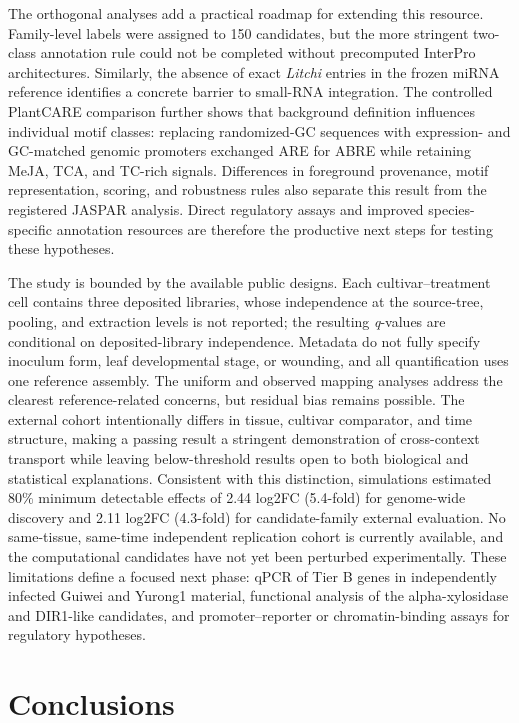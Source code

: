 \documentclass[11pt]{article}
\newcommand{\q}{\textit{q}}
\begin{document}
The orthogonal analyses add a practical roadmap for extending this resource. Family-level labels were assigned to 150 candidates, but the more stringent two-class annotation rule could not be completed without precomputed InterPro architectures. Similarly, the absence of exact \textit{Litchi} entries in the frozen miRNA reference identifies a concrete barrier to small-RNA integration. The controlled PlantCARE comparison further shows that background definition influences individual motif classes: replacing randomized-GC sequences with expression- and GC-matched genomic promoters exchanged ARE for ABRE while retaining MeJA, TCA, and TC-rich signals. Differences in foreground provenance, motif representation, scoring, and robustness rules also separate this result from the registered JASPAR analysis. Direct regulatory assays and improved species-specific annotation resources are therefore the productive next steps for testing these hypotheses.

The study is bounded by the available public designs. Each cultivar--treatment cell contains three deposited libraries, whose independence at the source-tree, pooling, and extraction levels is not reported; the resulting \q-values are conditional on deposited-library independence. Metadata do not fully specify inoculum form, leaf developmental stage, or wounding, and all quantification uses one reference assembly. The uniform and observed mapping analyses address the clearest reference-related concerns, but residual bias remains possible. The external cohort intentionally differs in tissue, cultivar comparator, and time structure, making a passing result a stringent demonstration of cross-context transport while leaving below-threshold results open to both biological and statistical explanations. Consistent with this distinction, simulations estimated 80\% minimum detectable effects of 2.44 log2FC (5.4-fold) for genome-wide discovery and 2.11 log2FC (4.3-fold) for candidate-family external evaluation. No same-tissue, same-time independent replication cohort is currently available, and the computational candidates have not yet been perturbed experimentally. These limitations define a focused next phase: qPCR of Tier B genes in independently infected Guiwei and Yurong1 material, functional analysis of the alpha-xylosidase and DIR1-like candidates, and promoter--reporter or chromatin-binding assays for regulatory hypotheses.

\section{Conclusions}
\end{document}
